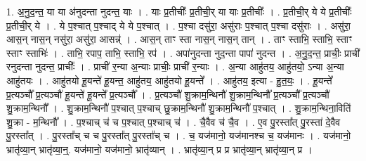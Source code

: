 \documentclass[17pt]{extarticle}
\begin{document}
1. अ॒नु॒द॒न्त॒ या या अ॑नुदन्ता नुदन्त॒ याः । . याः प्र॒तीचीः᳚ प्र॒तीची॒र् या याः प्र॒तीचीः᳚ । . प्र॒तीची॒र् ये ये प्र॒तीचीः᳚ प्र॒तीची॒र् ये । . ये प॒श्चात् प॒श्चाद् ये ये प॒श्चात् । . प॒श्चा दसु॑रा॒ असु॑राः प॒श्चात् प॒श्चा दसु॑राः । . असु॑रा॒ आस॒न् नास॒न् नसु॑रा॒ असु॑रा॒ आसन्न्॑ । . आस॒न् ताꣳ स्ता नास॒न् नास॒न् तान् । . ताꣳ स्ताभि॒ स्ताभि॒ स्ताꣳ स्ताꣳ स्ताभिः॑ । . ताभि॒ रपाप॒ ताभि॒ स्ताभि॒ रप॑ । . अपा॑नुदन्ता नुद॒न्ता पापा॑ नुदन्त । . अ॒नु॒द॒न्त॒ प्राचीः॒ प्राची॑ रनुदन्ता नुदन्त॒ प्राचीः᳚ । . प्राची॑ र॒न्या अ॒न्याः प्राचीः॒ प्राची॑ र॒न्याः । . अ॒न्या आहु॑तय॒ आहु॑तयो॒ ऽन्या अ॒न्या आहु॑तयः । . आहु॑तयो हू॒यन्ते॑ हू॒यन्त॒ आहु॑तय॒ आहु॑तयो हू॒यन्ते᳚ । . आहु॑तय॒ इत्या - हु॒त॒यः॒ । . हू॒यन्ते᳚ प्र॒त्यञ्चौ᳚ प्र॒त्यञ्चौ॑ हू॒यन्ते॑ हू॒यन्ते᳚ प्र॒त्यञ्चौ᳚ । . प्र॒त्यञ्चौ॑ शु॒क्राम॒न्थिनौ॑ शु॒क्राम॒न्थिनौ᳚ प्र॒त्यञ्चौ᳚ प्र॒त्यञ्चौ॑ शु॒क्राम॒न्थिनौ᳚ । . शु॒क्राम॒न्थिनौ॑ प॒श्चात् प॒श्चाच् छु॒क्राम॒न्थिनौ॑ शु॒क्राम॒न्थिनौ॑ प॒श्चात् । . शु॒क्राम॒न्थिना॒विति॑ शु॒क्रा - म॒न्थिनौ᳚ । . प॒श्चाच् च॑ च प॒श्चात् प॒श्चाच् च॑ । . चै॒वैव च॑ चै॒व । . ए॒व पु॒रस्ता᳚त् पु॒रस्ता॑ दे॒वैव पु॒रस्ता᳚त् । . पु॒रस्ता᳚च् च च पु॒रस्ता᳚त् पु॒रस्ता᳚च् च । . च॒ यज॑मानो॒ यज॑मानश्च च॒ यज॑मानः । . यज॑मानो॒ भ्रातृ॑व्या॒न् भ्रातृ॑व्या॒न्॒. यज॑मानो॒ यज॑मानो॒ भ्रातृ॑व्यान् । . भ्रातृ॑व्या॒न् प्र प्र भ्रातृ॑व्या॒न् भ्रातृ॑व्या॒न् प्र । \newline
\end{document}
